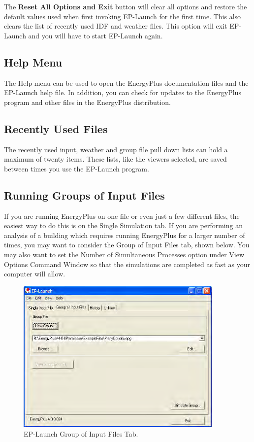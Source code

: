 The \textbf{Reset All Options and Exit} button will clear all options and restore the default values used when first invoking EP-Launch for the first time. This also clears the list of recently used IDF and weather files. This option will exit EP-Launch and you will have to start EP-Launch again.

\subsection{Help Menu}\label{help-menu}

The Help menu can be used to open the EnergyPlus documentation files and the EP-Launch help file. In addition, you can check for updates to the EnergyPlus program and other files in the EnergyPlus distribution.

\subsection{Recently Used Files}\label{recently-used-files}

The recently used input, weather and group file pull down lists can hold a maximum of twenty items. These lists, like the viewers selected, are saved between times you use the EP-Launch program.

\subsection{Running Groups of Input Files}\label{running-groups-of-input-files}

If you are running EnergyPlus on one file or even just a few different files, the easiest way to do this is on the Single Simulation tab. If you are performing an analysis of a building which requires running EnergyPlus for a larger number of times, you may want to consider the Group of Input Files tab, shown below. You may also want to set the Number of Simultaneous Processes option under View Options Command Window so that the simulations are completed as fast as your computer will allow.

\begin{figure}[hbtp] %
\centering
\includegraphics[width=0.9\textwidth, height=0.9\textheight, keepaspectratio=true]{media/image107.png}
\caption{EP-Launch Group of Input Files Tab. \protect \label{fig:ep-launch-group-of-input-files-tab.}}
\end{figure}

